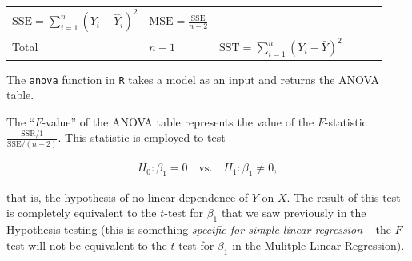 \documentclass[]{book}
\theoremstyle{definition}
\theoremstyle{definition}
\theoremstyle{definition}
\theoremstyle{remark}
\begin{document}
\begin{longtable}[]{@{}llllll@{}}
\begin{minipage}[t]{0.10\columnwidth}
\(\text{SSE}=\sum_{i=1}^n\left(Y_i-\hat Y_i\right)^2\)\strut
\end{minipage} & \begin{minipage}[t]{0.12\columnwidth}\raggedright\strut
\(\text{MSE}=\frac{\text{SSE}}{n-2}\)\strut
\end{minipage} & \begin{minipage}[t]{0.20\columnwidth}\raggedright\strut
\strut
\end{minipage} & \begin{minipage}[t]{0.20\columnwidth}\raggedright\strut
\strut
\end{minipage}\tabularnewline
\begin{minipage}[t]{0.03\columnwidth}\raggedright\strut
Total\strut
\end{minipage} & \begin{minipage}[t]{0.15\columnwidth}\raggedright\strut
\(n-1\)\strut
\end{minipage} & \begin{minipage}[t]{0.10\columnwidth}\raggedright\strut
\(\text{SST}=\sum_{i=1}^n\left(Y_i-\bar Y\right)^2\)\strut
\end{minipage} & \begin{minipage}[t]{0.12\columnwidth}\raggedright\strut
\strut
\end{minipage} & \begin{minipage}[t]{0.20\columnwidth}\raggedright\strut
\strut
\end{minipage} & \begin{minipage}[t]{0.20\columnwidth}\raggedright\strut
\strut
\end{minipage}\tabularnewline
\bottomrule
\end{longtable}

The \texttt{anova} function in \texttt{R} takes a model as an input and
returns the ANOVA table.

The ``\(F\)-value'' of the ANOVA table represents the value of the
\(F\)-statistic \(\frac{\text{SSR}/1}{\text{SSE}/(n-2)}\). This
statistic is employed to test

\begin{align*}
H_0:\beta_1=0\quad\text{vs.}\quad H_1:\beta_1\neq 0,
\end{align*}

that is, the hypothesis of no linear dependence of \(Y\) on \(X\). The
result of this test is completely equivalent to the \(t\)-test for
\(\beta_1\) that we saw previously in the Hypothesis testing (this is
something \emph{specific for simple linear regression} -- the \(F\)-test
will not be equivalent to the \(t\)-test for \(\beta_1\) in the Mulitple
Linear Regression).
\end{document}
